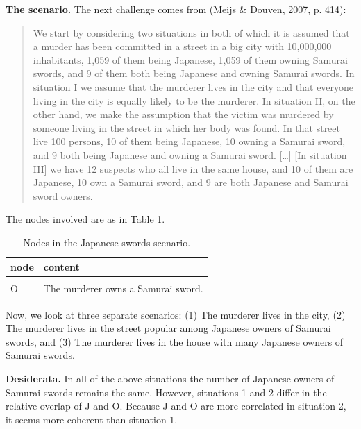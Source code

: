 \documentclass[
  10pt,
]{scrartcl}
\newcommand{\s}[1]{\textsf{#1}}
\begin{document}
\textbf{The scenario.} The next challenge comes from (Meijs \& Douven, 2007, p. 414):

\begin{quote}
  We start by considering two situations in both of which it is assumed that a murder has been committed in a street in a big city with 10,000,000 inhabitants, 1,059 of them being Japanese, 1,059 of them owning Samurai swords, and 9 of them both being Japanese and owning Samurai swords. In situation I we assume that the murderer lives in the city and that everyone living in the city is equally likely to be the murderer. In situation II, on the other hand, we make the assumption that the victim was murdered by someone living in the street in which her body was found. In that street live 100 persons, 10 of them being Japanese, 10 owning a Samurai sword, and 9 both being Japanese and owning a Samurai sword. [\dots] [In situation III] we have 12 suspects who all live in the same house, and 10 of them are Japanese, 10 own a Samurai sword, and 9 are both Japanese and Samurai sword owners.
\end{quote}

\noindent The nodes involved are as in Table \ref{tab:japanesePropositions1}.

\begin{table}[H]

\caption{\label{tab:japanesePropositions1}Nodes in the Japanese swords scenario.}
\centering
\begin{tabular}[t]{ll}
\toprule
node & content\\
\midrule
\cellcolor{gray!6}{J} & \cellcolor{gray!6}{The murderer is Japanese.}\\
O & The murderer owns a Samurai sword.\\
\bottomrule
\end{tabular}
\end{table}

Now, we look at three separate scenarios: (\textsf{1}) The murderer lives in the city, (\textsf{2}) The murderer lives in the street popular among Japanese owners of Samurai swords, and (\textsf{3}) The murderer lives in the house with many Japanese owners of Samurai swords.

\noindent \textbf{Desiderata.} In all of the above situations the number of Japanese owners of Samurai swords remains the same. However, situations 1 and 2 differ in the relative overlap of \s{J} and \s{O}. Because \s{J} and \s{O} are more correlated in situation 2, it seems more coherent than situation 1.
\end{document}
